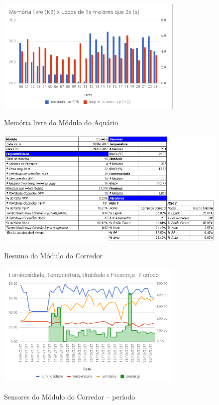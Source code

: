 \begin{figure}[H]
	\centering
	\caption{Memória livre do Módulo do Aquário}
	\includegraphics[width=0.8\textwidth]{MemLivreAqua}
	\label{fig:MemLivreAqua}
\end{figure}

\begin{figure}[H]
	\centering
	\caption{Resumo do Módulo do Corredor}
	\includegraphics[width=1.0\textwidth]{resumoCorredor}
	\label{fig:resumoCorredor}
\end{figure}

\begin{figure}[H]
	\centering
	\caption{Sensores do Módulo do Corredor -- período}
	\includegraphics[width=0.8\textwidth]{sensoresperiodoCorredor}
	\label{fig:sensoresperiodoCorredor}
\end{figure}

